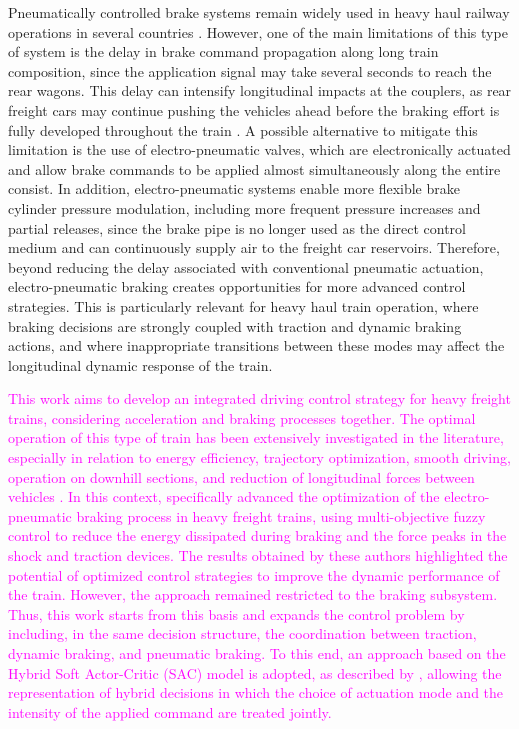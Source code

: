\documentclass[preprint,10pt]{elsarticle}
\begin{document}
Pneumatically controlled brake systems remain widely used in heavy haul railway operations in several countries \citep{wei2017air,eckert2023fast}. However, one of the main limitations of this type of system is the delay in brake command propagation along long train composition, since the application signal may take several seconds to reach the rear wagons. This delay can intensify longitudinal impacts at the couplers, as rear freight cars may continue pushing the vehicles ahead before the braking effort is fully developed throughout the train \citep{oprea2013alternative}. A possible alternative to mitigate this limitation is the use of electro-pneumatic valves, which are electronically actuated and allow brake commands to be applied almost simultaneously along the entire consist. In addition, electro-pneumatic systems enable more flexible brake cylinder pressure modulation, including more frequent pressure increases and partial releases, since the brake pipe is no longer used as the direct control medium and can continuously supply air to the freight car reservoirs. Therefore, beyond reducing the delay associated with conventional pneumatic actuation, electro-pneumatic braking creates opportunities for more advanced control strategies. This is particularly relevant for heavy haul train operation, where braking decisions are strongly coupled with traction and dynamic braking actions, and where inappropriate transitions between these modes may affect the longitudinal dynamic response of the train.

\textcolor{Magenta}{This work aims to develop an integrated driving control strategy for heavy freight trains, considering acceleration and braking processes together. The optimal operation of this type of train has been extensively investigated in the literature, especially in relation to energy efficiency, trajectory optimization, smooth driving, operation on downhill sections, and reduction of longitudinal forces between vehicles \citep{lin2017energy,howlett2016new,bai2020multi,wang2019intelligent,zhang2013optimal,yi2022research}. In this context, \cite{eckert2025multi} specifically advanced the optimization of the electro-pneumatic braking process in heavy freight trains, using multi-objective fuzzy control to reduce the energy dissipated during braking and the force peaks in the shock and traction devices. The results obtained by these authors highlighted the potential of optimized control strategies to improve the dynamic performance of the train. However, the approach remained restricted to the braking subsystem. Thus, this work starts from this basis and expands the control problem by including, in the same decision structure, the coordination between traction, dynamic braking, and pneumatic braking. To this end, an approach based on the Hybrid Soft Actor-Critic (SAC) model is adopted, as described by \cite{delalleau2019discretecontinuousactionrepresentation}, allowing the representation of hybrid decisions in which the choice of actuation mode and the intensity of the applied command are treated jointly.}
\end{document}
